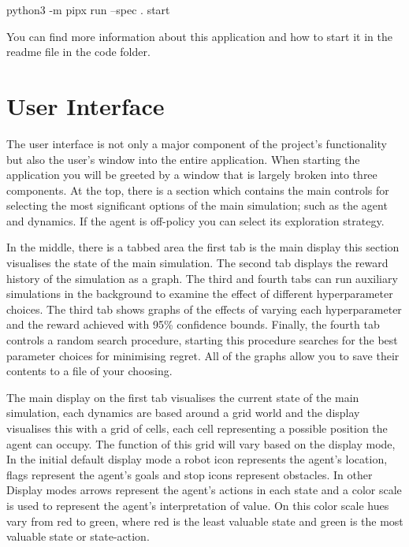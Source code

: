\documentclass[]{final_report}
\begin{document}
\begin{verbatim*}
python3 -m pipx run --spec . start
\end{verbatim*}

You can find more information about this application and how to start it in the readme file in the code folder.

\section{User Interface}

The user interface is not only a major component of the project's functionality but also the user's window into the entire application. When starting the application you will be greeted by a window that is largely broken into three components. At the top, there is a section which contains the main controls for selecting the most significant options of the main simulation; such as the agent and dynamics. If the agent is off-policy you can select its exploration strategy. 

In the middle, there is a tabbed area the first tab is the main display this section visualises the state of the main simulation. The second tab displays the reward history of the simulation as a graph. The third and fourth tabs can run auxiliary simulations in the background to examine the effect of different hyperparameter choices. The third tab shows graphs of the effects of varying each hyperparameter and the reward achieved with 95\% confidence bounds. Finally, the fourth tab controls a random search procedure, starting this procedure searches for the best parameter choices for minimising regret. All of the graphs allow you to save their contents to a file of your choosing. 

The main display on the first tab visualises the current state of the main simulation, each dynamics are based around a grid world and the display visualises this with a grid of cells, each cell representing a possible position the agent can occupy. The function of this grid will vary based on the display mode, In the initial default display mode a robot icon represents the agent's location, flags represent the agent's goals and stop icons represent obstacles. In other Display modes arrows represent the agent's actions in each state and a color scale is used to represent the agent's interpretation of value. On this color scale hues vary from red to green, where red is the least valuable state and green is the most valuable state or state-action.
\end{document}
